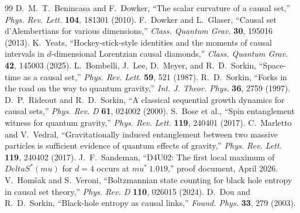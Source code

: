 \documentclass[11pt]{article}
\def\Delta{Delta}%
\def\mu{mu}%
\def\approx{~}%
\begin{document}
\begin{thebibliography}{99}
 D.~M.~T.~Benincasa and F.~Dowker, ``The scalar curvature of a causal set,'' \emph{Phys. Rev. Lett.} \textbf{104}, 181301 (2010).
 F.~Dowker and L.~Glaser, ``Causal set d'Alembertians for various dimensions,'' \emph{Class. Quantum Grav.} \textbf{30}, 195016 (2013).
 K.~Yeats, ``Hockey-stick-style identities and the moments of causal intervals in $d$-dimensional Lorentzian causal diamonds,'' \emph{Class. Quantum Grav.} \textbf{42}, 145003 (2025).
 L.~Bombelli, J.~Lee, D.~Meyer, and R.~D.~Sorkin, ``Space-time as a causal set,'' \emph{Phys. Rev. Lett.} \textbf{59}, 521 (1987).
 R.~D.~Sorkin, ``Forks in the road on the way to quantum gravity,'' \emph{Int. J. Theor. Phys.} \textbf{36}, 2759 (1997).
 D.~P.~Rideout and R.~D.~Sorkin, ``A classical sequential growth dynamics for causal sets,'' \emph{Phys. Rev. D} \textbf{61}, 024002 (2000).
 S.~Bose et al., ``Spin entanglement witness for quantum gravity,'' \emph{Phys. Rev. Lett.} \textbf{119}, 240401 (2017).
 C.~Marletto and V.~Vedral, ``Gravitationally induced entanglement between two massive particles is sufficient evidence of quantum effects of gravity,'' \emph{Phys. Rev. Lett.} \textbf{119}, 240402 (2017).
 J.~F.~Sandeman, ``D4U02: The first local maximum of $\Delta S^*(\mu)$ for $d=4$ occurs at $\mu^*\approx 1.019$,'' proof document, April 2026.
 V.~Hom\v{s}ak and S.~Veroni, ``Boltzmannian state counting for black hole entropy in causal set theory,'' \emph{Phys. Rev. D} \textbf{110}, 026015 (2024).
 D.~Dou and R.~D.~Sorkin, ``Black-hole entropy as causal links,'' \emph{Found. Phys.} \textbf{33}, 279 (2003).
\end{thebibliography}
\end{document}
